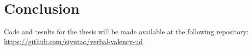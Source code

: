 \chapter{Conclusion}\label{chapter:conclusion}

Code and results for the thesis will be made available at the following repository: \url{https://github.com/siyutao/verbal-valency-ud}

